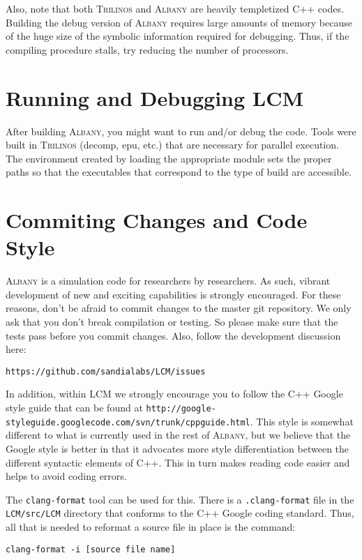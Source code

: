 \documentclass{article}
\newcommand{\trilinos}{\textsc{Trilinos}}
\newcommand{\albany}{\textsc{Albany}}
\newcommand{\lcm}{\textsc{LCM}}
\begin{document}
Also, note that both \trilinos{} and \albany{} are heavily templetized
C++ codes. Building the debug version of \albany{} requires large
amounts of memory because of the huge size of the symbolic information
required for debugging. Thus, if the compiling procedure stalls, try
reducing the number of processors.

\section{Running and Debugging \lcm{}} 

After building \albany{}, you might want to run and/or debug the code.
Tools were built in \trilinos{} (decomp, epu, etc.) that are necessary
for parallel execution. The environment created by loading the
appropriate module sets the proper paths so that the executables that
correspond to the type of build are accessible.

\section{Commiting Changes and Code Style}
\albany{} is a simulation code for researchers by researchers. As
such, vibrant development of new and exciting capabilities is strongly
encouraged. For these reasons, don't be afraid to commit changes to
the master git repository. We only ask that you don't break
compilation or testing. So please make sure that the tests pass before
you commit changes. Also, follow the development discussion here:
\begin{verbatim}
https://github.com/sandialabs/LCM/issues
\end{verbatim}

In addition, within \lcm{} we strongly encourage you to follow the C++
Google style guide that can be found at
\verb+http://google-styleguide.googlecode.com/svn/trunk/cppguide.html+.
This style is somewhat different to what is currently used in the rest
of \albany{}, but we believe that the Google style is better in that
it advocates more style differentiation between the different
syntactic elements of C++. This in turn makes reading code easier and
helps to avoid coding errors.

The \verb+clang-format+ tool can be used for this. There is a
\verb+.clang-format+ file in the \verb+LCM/src/LCM+ directory that conforms
to the C++ Google coding standard. Thus, all that is needed to reformat a
source file in place is the command:
\begin{verbatim}
clang-format -i [source file name]
\end{verbatim}
\end{document}
